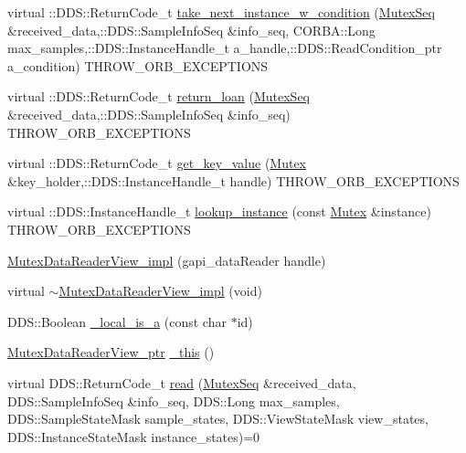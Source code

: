 \begin{DoxyCompactItemize}
\item 
virtual ::DDS::ReturnCode\_\-t \hyperlink{classKnowledge_1_1MutexDataReaderView__impl_a61639d368b988108260ae8b6025dc841}{take\_\-next\_\-instance\_\-w\_\-condition} (\hyperlink{namespaceKnowledge_a3165529aa87299c6a92754fbd7eeeff4}{MutexSeq} \&received\_\-data,::DDS::SampleInfoSeq \&info\_\-seq, CORBA::Long max\_\-samples,::DDS::InstanceHandle\_\-t a\_\-handle,::DDS::ReadCondition\_\-ptr a\_\-condition) THROW\_\-ORB\_\-EXCEPTIONS
\item 
virtual ::DDS::ReturnCode\_\-t \hyperlink{classKnowledge_1_1MutexDataReaderView__impl_a8b1d7157a32a5df190f8e280be4af6bb}{return\_\-loan} (\hyperlink{namespaceKnowledge_a3165529aa87299c6a92754fbd7eeeff4}{MutexSeq} \&received\_\-data,::DDS::SampleInfoSeq \&info\_\-seq) THROW\_\-ORB\_\-EXCEPTIONS
\item 
virtual ::DDS::ReturnCode\_\-t \hyperlink{classKnowledge_1_1MutexDataReaderView__impl_a6e55a456fca63b98858946f2e3f48267}{get\_\-key\_\-value} (\hyperlink{structKnowledge_1_1Mutex}{Mutex} \&key\_\-holder,::DDS::InstanceHandle\_\-t handle) THROW\_\-ORB\_\-EXCEPTIONS
\item 
virtual ::DDS::InstanceHandle\_\-t \hyperlink{classKnowledge_1_1MutexDataReaderView__impl_ae35042ad5ee638609b03c37cd9f33b8f}{lookup\_\-instance} (const \hyperlink{structKnowledge_1_1Mutex}{Mutex} \&instance) THROW\_\-ORB\_\-EXCEPTIONS
\item 
\hyperlink{classKnowledge_1_1MutexDataReaderView__impl_a2248a490a737655c28e5cc5f1248ba29}{MutexDataReaderView\_\-impl} (gapi\_\-dataReader handle)
\item 
virtual \hyperlink{classKnowledge_1_1MutexDataReaderView__impl_ac6a74bd4b57aa1a4d24550aa2549f443}{$\sim$MutexDataReaderView\_\-impl} (void)
\item 
DDS::Boolean \hyperlink{classKnowledge_1_1MutexDataReaderView_ae761ad249559f3b3c39c52ffc9d2547d}{\_\-local\_\-is\_\-a} (const char $\ast$id)
\item 
\hyperlink{classKnowledge_1_1MutexDataReaderView}{MutexDataReaderView\_\-ptr} \hyperlink{classKnowledge_1_1MutexDataReaderView_a7962b5777640ce1743eb23b1d8d2fc5c}{\_\-this} ()
\item 
virtual DDS::ReturnCode\_\-t \hyperlink{classKnowledge_1_1MutexDataReaderView_acc93435f3bf847b12dfbaf7d660a312e}{read} (\hyperlink{namespaceKnowledge_a3165529aa87299c6a92754fbd7eeeff4}{MutexSeq} \&received\_\-data, DDS::SampleInfoSeq \&info\_\-seq, DDS::Long max\_\-samples, DDS::SampleStateMask sample\_\-states, DDS::ViewStateMask view\_\-states, DDS::InstanceStateMask instance\_\-states)=0

\end{DoxyCompactItemize}
